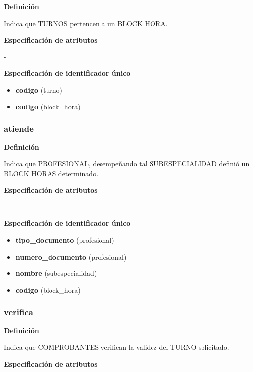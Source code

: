 \documentclass[a4paper,11pt]{article}
\begin{document}
\textbf{Definición}

Indica que TURNOS pertencen a un BLOCK HORA.

\textbf{Especificación de atributos}

-

\textbf{Especificación de identificador único}

\begin{itemize}

     \item \textbf{codigo} (turno)

     \item \textbf{codigo} (block\_hora)

\end{itemize}

\subsubsection{\textbf{atiende}}

\textbf{Definición}

Indica que PROFESIONAL, desempeñando tal SUBESPECIALIDAD definió un BLOCK 
HORAS determinado.

\textbf{Especificación de atributos}

-

\textbf{Especificación de identificador único}

\begin{itemize}

     \item \textbf{tipo\_documento} (profesional)

     \item \textbf{numero\_documento} (profesional)

     \item \textbf{nombre} (subespecialidad)

     \item \textbf{codigo} (block\_hora)

\end{itemize}

\subsubsection{\textbf{verifica}}

\textbf{Definición}

Indica que COMPROBANTES verifican la validez del TURNO solicitado.

\textbf{Especificación de atributos}
\end{document}
